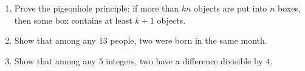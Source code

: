 \begin{enumerate}
\item[(a)] Prove the pigeonhole principle: if more than $kn$ objects are put into $n$ boxes, then some box contains at least $k+1$ objects.
\item[(b)] Show that among any $13$ people, two were born in the same month.
\item[(c)] Show that among any $5$ integers, two have a difference divisible by $4$.
\end{enumerate}
